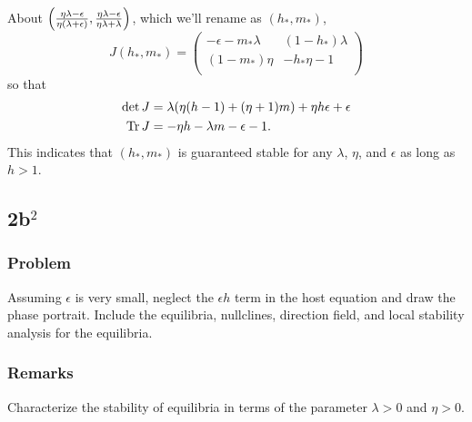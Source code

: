 \documentclass[12pt]{article}
\begin{document}
About $\left(\frac{\eta\lambda-\epsilon}{\eta(\lambda+\epsilon)}, \frac{\eta\lambda-\epsilon}{\eta\lambda+\lambda}\right)$, which we'll rename as
$(h_*,m_*)$,
\begin{equation*}
  J(h_*,m_*) =
  \begin{pmatrix}
    -\epsilon-m_*\lambda & (1-h_*)\lambda \\
    (1-m_*)\eta  & -h_*\eta-1 \\
  \end{pmatrix}
\end{equation*}
so that
\begin{equation*}
  \begin{aligned}
    \det{J} &= \lambda(\eta(h-1)+(\eta+1)m)+\eta h\epsilon+\epsilon \\
    \operatorname{Tr}{J} &= -\eta h-\lambda m-\epsilon-1. \\
  \end{aligned}
\end{equation*}
This indicates that $(h_*,m_*)$ is guaranteed stable for any $\lambda$, $\eta$,
and $\epsilon$ as long as $h>1$.

\newpage
\subsection{2b$^2$}
\subsubsection*{Problem}
Assuming $\epsilon$ is very small, neglect the $\epsilon h$ term in the host equation
and draw the phase portrait. Include the equilibria, nullclines, direction
field, and local stability analysis for the equilibria.

\subsubsection*{Remarks}
Characterize the stability of equilibria in terms of the parameter $\lambda>0$
and $\eta>0$.
\end{document}
